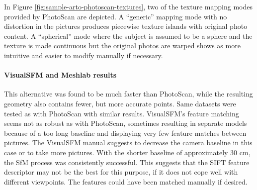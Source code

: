 In Figure \ref{fig:sample-arto-photoscan-textures}, two of the texture mapping modes provided by PhotoScan are depicted.
A ``generic'' mapping mode with no distortion in the pictures produces piecewise texture islands with original photo content.
A ``spherical'' mode where the subject is assumed to be a sphere and the texture is made continuous but the original photos are warped shows as more intuitive and easier to modify manually if necessary.




\paragraph{VisualSFM and Meshlab results}
This alternative was found to be much faster than PhotoScan, while the resulting geometry also contains fewer, but more accurate points.
Same datasets were tested as with PhotoScan with similar results.
VisualSFM's feature matching seems not as robust as with PhotoScan, sometimes resulting in separate models because of a too long baseline and displaying very few feature matches between pictures.
The VisualSFM manual suggests to decrease the camera baseline in this case or to take more pictures.
With the shorter baseline of approximately 30 cm, the SfM process was consistently successful.
This suggests that the SIFT feature descriptor may not be the best for this purpose, if it does not cope well with different viewpoints.
The features could have been matched manually if desired.

